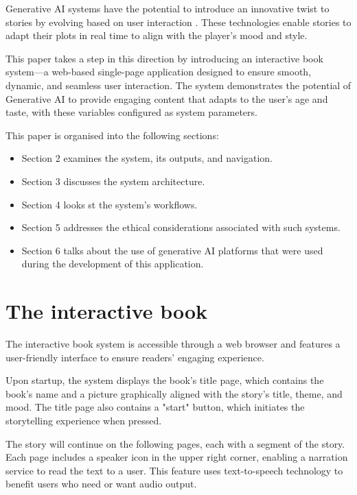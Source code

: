 \documentclass[conference]{IEEEtran}
\begin{document}
	Generative AI systems have the potential to introduce an innovative twist to stories by evolving based on user interaction\cite{vidrih2023generative} \cite{fotedar2020storytelling}. These technologies enable stories to adapt their plots in real time to align with the player’s mood and style.
	
	This paper takes a step in this direction by introducing an interactive book system—a web-based single-page application designed to ensure smooth, dynamic, and seamless user interaction. The system demonstrates the potential of Generative AI to provide engaging content that adapts to the user's age and taste, with these variables configured as system parameters.
	
	This paper is organised into the following sections:
	
	\begin{itemize}
		
		\item Section 2 examines the system, its outputs, and navigation.
		\item Section 3 discusses the system architecture.
		\item Section 4 looks st the system's workflows.
		\item Section 5 addresses the ethical considerations associated with such systems.
		\item Section 6 talks about the use of generative AI platforms that were used during the development of this application.
		
	\end{itemize}
	
	
	\section{The interactive book}
	
	The interactive book system is accessible through a web browser and features a user-friendly interface to ensure readers' engaging experience.
	
	Upon startup, the system displays the book's title page, which contains the book's name and a picture graphically aligned with the story's title, theme, and mood. The title page also contains a "start" button, which initiates the storytelling experience when pressed.
	
	The story will continue on the following pages, each with a segment of the story. Each page includes a speaker icon in the upper right corner, enabling a narration service to read the text to a user. This feature uses text-to-speech technology to benefit users who need or want audio output.
	
\end{document}
